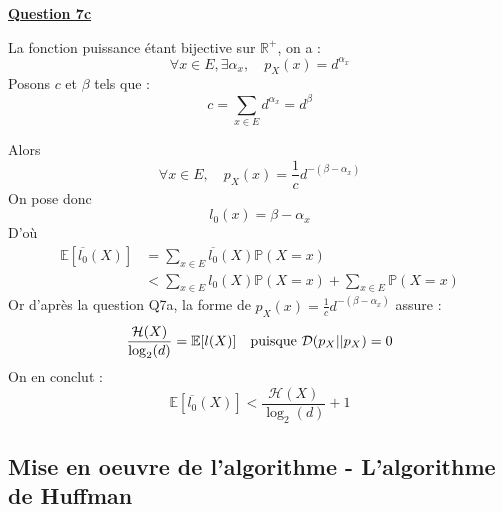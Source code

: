 \documentclass[a4paper,twoside,10pt]{article}
\renewcommand{\H}{\mathcal{H}}
\newcommand{\D}{\mathcal{D}}
\newenvironment{Q}[1]{%
\vspace{1ex}
\underline{\textbf{Question #1\\}}
\newline
}{
\vspace{2ex}
}
\begin{document}
\begin{Q}{7c}
La fonction puissance étant bijective sur $\mathbb{R^+}$, on a :
\[
\forall x \in E, \exists \alpha_x, \quad p_X(x) = d ^{\alpha_x}
\]
Posons $c$ et $\beta$ tels que :
\[
c = \sum_{x \in E} d ^{\alpha_x} = d^\beta
\]

Alors
\[
\forall x \in E, \quad p_X(x) = \frac{1}{c} d^{-(\beta - \alpha_x)}
\]
On pose donc
\[
l_0(x) = \beta - \alpha_x
\]
D'où
\begin{align*}
\mathbb{E}[\overline{l_0}(X)] &= \sum_{x \in E} \overline{l_0}(X) \mathbb{P}(X=x)\\
&< \sum_{x \in E} l_0(X)\mathbb{P}(X=x) + \sum_{x \in E}\mathbb{P}(X=x)
\end{align*}
Or d'après la question Q7a, la forme de $p_X(x)= \frac{1}{c} d^{-(\beta - \alpha_x)}$ assure :
\[
\frac{\H(X)}{\log_2(d)} = \mathbb{E}[l(X)] \text{\quad puisque } \D(p_X||p_X) = 0
\]
On en conclut :
\[
\mathbb{E}[\overline{l_0}(X)] < \frac{\H(X)}{\log_2(d)} + 1
\]
\end{Q}

\subsection{Mise en oeuvre de l'algorithme - L'algorithme de Huffman}
\end{document}
